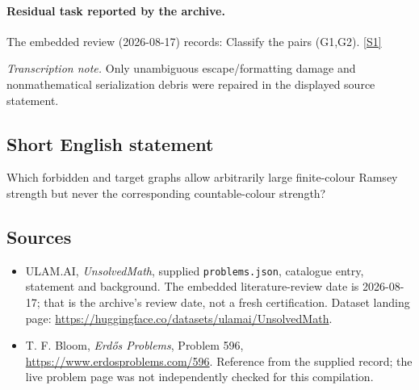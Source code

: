 \documentclass[11pt,a4paper]{article}
\newcommand{\sref}[2]{\hyperlink{source:#1:#2}{[S#2]}}
\begin{document}
\paragraph{Residual task reported by the archive.}

The embedded review (2026-08-17) records: Classify the pairs (G1,G2). \sref{statement}{1}

{\small\emph{Transcription note.} Only unambiguous escape/formatting damage and nonmathematical serialization debris were repaired in the displayed source statement.}

\subsection{Short English statement}

Which forbidden and target graphs allow arbitrarily large finite-colour Ramsey strength but never the corresponding countable-colour strength?

\subsection{Sources}

{\small

\begin{itemize}

\item[\hypertarget{source:statement:1}{S1}] ULAM.AI, \emph{UnsolvedMath}, supplied \texttt{problems.json}, catalogue entry, statement and background. The embedded literature-review date is 2026-08-17; that is the archive’s review date, not a fresh certification. Dataset landing page: \url{https://huggingface.co/datasets/ulamai/UnsolvedMath}.

\item[\hypertarget{source:statement:2}{S2}] T. F. Bloom, \emph{Erdős Problems}, Problem 596, \url{https://www.erdosproblems.com/596}. Reference from the supplied record; the live problem page was not independently checked for this compilation.

\end{itemize}

}

\label{end:statement}
\end{document}
